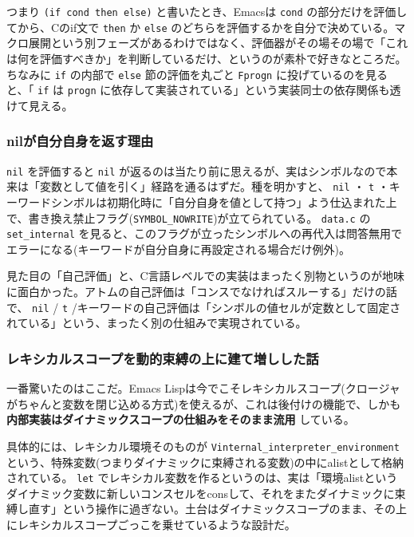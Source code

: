 \documentclass[11pt]{article}
\begin{document}
つまり \texttt{(if cond then else)} と書いたとき、Emacsは \texttt{cond} の部分だけを評価してから、Cのif文で \texttt{then} か \texttt{else} のどちらを評価するかを自分で決めている。マクロ展開という別フェーズがあるわけではなく、評価器がその場その場で「これは何を評価すべきか」を判断しているだけ、というのが素朴で好きなところだ。ちなみに \texttt{if} の内部で \texttt{else} 節の評価を丸ごと \texttt{Fprogn} に投げているのを見ると、「 \texttt{if} は \texttt{progn} に依存して実装されている」という実装同士の依存関係も透けて見える。
\subsubsection{nilが自分自身を返す理由}
\label{sec:org917ba67}

\texttt{nil} を評価すると \texttt{nil} が返るのは当たり前に思えるが、実はシンボルなので本来は「変数として値を引く」経路を通るはずだ。種を明かすと、 \texttt{nil} ・ \texttt{t} ・キーワードシンボルは初期化時に「自分自身を値として持つ」よう仕込まれた上で、書き換え禁止フラグ(\texttt{SYMBOL\_NOWRITE})が立てられている。 \texttt{data.c} の \texttt{set\_internal} を見ると、このフラグが立ったシンボルへの再代入は問答無用でエラーになる(キーワードが自分自身に再設定される場合だけ例外)。

見た目の「自己評価」と、C言語レベルでの実装はまったく別物というのが地味に面白かった。アトムの自己評価は「コンスでなければスルーする」だけの話で、 \texttt{nil} / \texttt{t} /キーワードの自己評価は「シンボルの値セルが定数として固定されている」という、まったく別の仕組みで実現されている。
\subsubsection{レキシカルスコープを動的束縛の上に建て増しした話}
\label{sec:orgf9cbb96}

一番驚いたのはここだ。Emacs Lispは今でこそレキシカルスコープ(クロージャがちゃんと変数を閉じ込める方式)を使えるが、これは後付けの機能で、しかも \textbf{内部実装はダイナミックスコープの仕組みをそのまま流用} している。

具体的には、レキシカル環境そのものが \texttt{Vinternal\_interpreter\_environment} という、特殊変数(つまりダイナミックに束縛される変数)の中にalistとして格納されている。 \texttt{let} でレキシカル変数を作るというのは、実は「環境alistというダイナミック変数に新しいコンスセルをconsして、それをまたダイナミックに束縛し直す」という操作に過ぎない。土台はダイナミックスコープのまま、その上にレキシカルスコープごっこを乗せているような設計だ。
\end{document}
